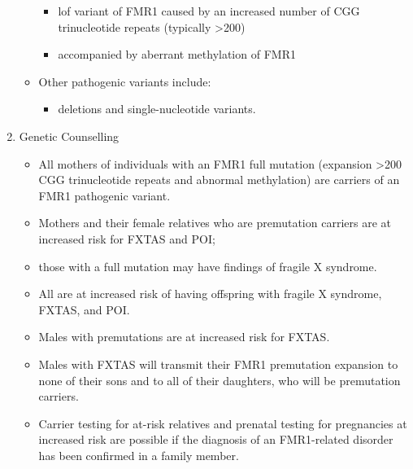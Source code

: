 \documentclass[12pt]{scrartcl}
\begin{document}
\begin{enumerate}
\begin{itemize}
\begin{itemize}
\item lof variant of FMR1 caused by an increased number of CGG
trinucleotide repeats (typically >200)
\item accompanied by aberrant methylation of FMR1
\end{itemize}
\item Other pathogenic variants include:
\begin{itemize}
\item deletions and single-nucleotide variants.
\end{itemize}
\end{itemize}
\item Genetic Counselling
\label{sec:org54b77f0}
\begin{itemize}
\item All mothers of individuals with an FMR1 full mutation (expansion
>200 CGG trinucleotide repeats and abnormal methylation) are
carriers of an FMR1 pathogenic variant.
\item Mothers and their female relatives who are premutation carriers are
at increased risk for FXTAS and POI;
\item those with a full mutation may have findings of fragile X syndrome.
\item All are at increased risk of having offspring with fragile X syndrome, FXTAS, and POI.
\item Males with premutations are at increased risk for FXTAS.
\item Males with FXTAS will transmit their FMR1 premutation expansion to none of their sons and to all of their daughters, who will be premutation carriers.
\item Carrier testing for at-risk relatives and prenatal testing for
pregnancies at increased risk are possible if the diagnosis of an
FMR1-related disorder has been confirmed in a family member.
\end{itemize}
\end{enumerate}
\end{document}
